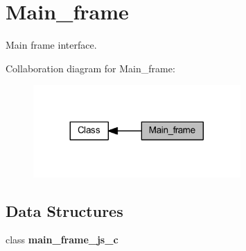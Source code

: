 \section{Main\+\_\+frame}
\label{group__main__frame}


Main frame interface.  


Collaboration diagram for Main\+\_\+frame\+:\nopagebreak
\begin{figure}[H]
\begin{center}
\leavevmode
\includegraphics[width=224pt]{group__main__frame}
\end{center}
\end{figure}
\subsection*{Data Structures}
\begin{DoxyCompactItemize}
\item 
class \textbf{ main\+\_\+frame\+\_\+js\+\_\+c}
\end{DoxyCompactItemize}

